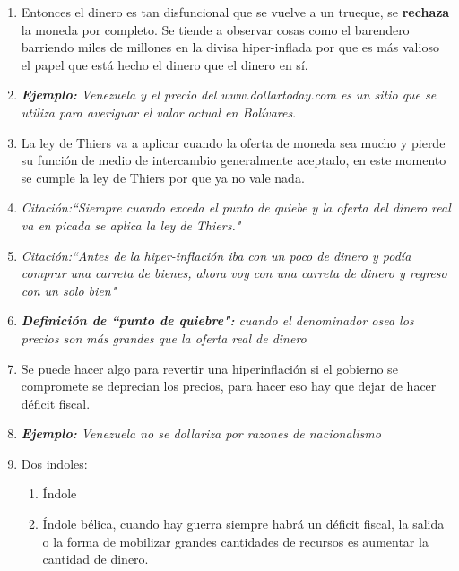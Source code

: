 \begin{enumerate}
        \item Entonces el dinero es tan disfuncional que se vuelve a un trueque, se \textbf{rechaza} la moneda por completo. Se tiende a observar cosas como el barendero barriendo miles de millones en la divisa hiper-inflada por que es más valioso el papel que está hecho el dinero que el dinero en sí.
        \item \emph{\textbf{Ejemplo: }Venezuela y el precio del www.dollartoday.com es un sitio que se utiliza para averiguar el valor actual en Bolívares}.
        \item La ley de Thiers va a aplicar cuando la oferta de moneda sea mucho y pierde su función de medio de intercambio generalmente aceptado, en este momento se cumple la ley de Thiers por que ya no vale nada.
        \item \emph{Citación:``Siempre cuando exceda el punto de quiebe y la oferta del dinero real va en picada se aplica la ley de Thiers."}
        \item \emph{Citación:``Antes de la hiper-inflación iba con un poco de dinero y podía comprar una carreta de bienes, ahora voy con una carreta de dinero y regreso con un solo bien"}
        \item \emph{\textbf{Definición de ``punto de quiebre":} cuando el denominador  osea los precios son más grandes que la oferta real de dinero}
        \item Se puede hacer algo para revertir una hiperinflación si el gobierno se compromete se deprecian los precios, para hacer eso hay que  dejar de hacer déficit fiscal.
        \item \emph{\textbf{Ejemplo: }Venezuela no se dollariza por razones de nacionalismo}
        \item Dos indoles:
            \begin{enumerate}
                \item Índole 
                \item Índole bélica, cuando hay guerra siempre habrá un déficit fiscal, la salida o la forma de mobilizar grandes cantidades de recursos es aumentar la cantidad de dinero.
            \end{enumerate}
        

\end{enumerate}
